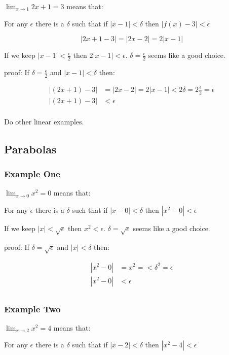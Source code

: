 \documentclass[letterpaper, landscape]{exam}
\begin{document}
  $\lim_{x \to 1} 2x + 1 = 3$ means that:

  For any $\epsilon$ there is a $\delta$ such that if $|x - 1| < \delta$ then
  $|f(x) - 3| < \epsilon$ 

  \[
    |2x + 1 - 3| = |2x - 2| = 2 |x - 1|
  \]

  If we keep $|x - 1| < \frac{\epsilon}{2}$ then $2 |x - 1| < \epsilon$.
  $\delta = \frac{\epsilon}{2}$ seems like a good choice.

  proof:
  If $\delta = \frac{\epsilon}{2}$ and $|x - 1| < \delta$ then:

  \begin{align*}
    |(2x + 1) - 3| & = |2x - 2| = 2 |x - 1| < 2 \delta = 2 \frac{\epsilon}{2} = \epsilon \\
    |(2x + 1) - 3| & < \epsilon \\
  \end{align*}

  Do other linear examples.

  \subsection{Parabolas}

  \subsubsection{Example One}
  $\lim_{x \to 0} x^2 = 0$ means that:

  For any $\epsilon$ there is a $\delta$ such that if $|x - 0| < \delta$ then
  $|x^2 - 0| < \epsilon$ 

  If we keep $|x| < \sqrt{\epsilon}$ then $x^2< \epsilon$.
  $\delta = \sqrt{\epsilon}$ seems like a good choice.

  proof:
  If $\delta = \sqrt{\epsilon}$ and $|x| < \delta$ then:

  \begin{align*}
    |x^2 - 0| & = x^2 = < \delta^2 = \epsilon \\
    |x^2 - 0| & < \epsilon \\
  \end{align*}

  \subsubsection{Example Two}
  $\lim_{x \to 2} x^2 = 4$ means that:

  For any $\epsilon$ there is a $\delta$ such that if $|x - 2| < \delta$ then
  $|x^2 - 4| < \epsilon$ 
\end{document}
